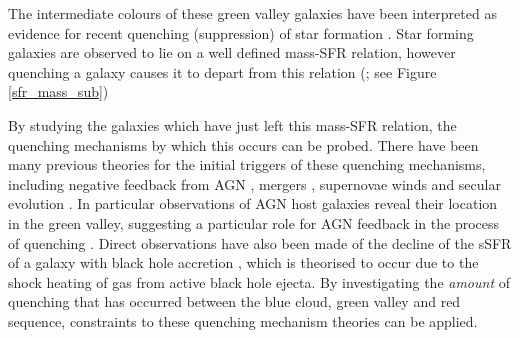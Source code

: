 \documentclass{mn2e}
\begin{document}
The intermediate colours of these green valley galaxies have been interpreted as evidence for recent quenching (suppression) of star formation \citep{Salim07}. Star forming galaxies are observed to lie on a well defined mass-SFR relation, however quenching a galaxy causes it to depart from this relation (\citealt{Noeske07, Peng}; see Figure \ref{sfr_mass_sub})

By studying the galaxies which  have just left this mass-SFR relation, the quenching mechanisms by which this occurs can be probed. There have been many previous theories for the initial triggers of these quenching mechanisms, including negative feedback from AGN \citep{Sch07}, mergers \citep{Darg10a}, supernovae winds \citep{MFB12} and secular evolution \citep{Masters10, Masters11}. In particular observations of AGN host galaxies reveal their location in the green valley, suggesting a particular role for AGN feedback in the process of quenching \citep{Nandra07, Hasinger08, Silverman08, Sch2014}. Direct observations have also been made of the decline of the sSFR of a galaxy with black hole accretion \citep{Sch07, Wild07, Nandra07}, which is theorised to occur due to the shock heating of gas from active black hole ejecta. By investigating the \emph{amount} of quenching that has occurred between the blue cloud, green valley and red sequence, constraints to these quenching mechanism theories can be applied. 
\end{document}
